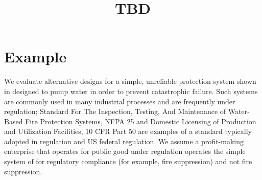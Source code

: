 \documentclass[review]{elsarticle}
\begin{document}
\begin{frontmatter}

\title{TBD}


\author[a]{}
\ead{}

\author[a]{}




\address[a]{TBD%
}
\begin{comment}
\begin{abstract}
A quantifiable method to obtain an ordered ranking of alternative maintenance policies in a simple system is summarized.
Application of the ranking method to economic analysis of a regulated process is described.
A new model for the impact of regulation and level of care on maintenance policy decision-making is
presented.
\end{abstract}

\begin{keyword}
RISMC \sep Maintenance policy \sep Decision analysis
\end{keyword}
\end{comment}

\end{frontmatter}

\section{Example}\label{sec:introduction}
	We evaluate alternative designs for a simple, unreliable protection system shown in 
	 designed to pump water in order to prevent catastrophic failure. 
	Such systems are commonly used in many industrial processes and are frequently under
	regulation; Standard For The Inspection, Testing, And Maintenance of Water-Based Fire Protection 
	Systems, NFPA 25 and Domestic Licensing of Production and Utilization Facilities, 10 CFR Part 50 are
	examples of a standard typically adopted in regulation and US federal regulation.
	We assume a profit-making enterprise that operates for public good under regulation operates the 
	simple system of  for regulatory compliance (for example, fire suppression) 
	and not fire suppression.
	
\end{document}
